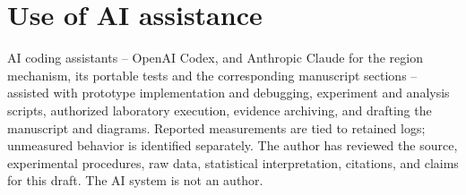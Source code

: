 \section*{Use of AI assistance}
AI coding assistants -- OpenAI Codex, and Anthropic Claude for the region
mechanism, its portable tests and the corresponding manuscript sections --
assisted with prototype implementation and debugging, experiment and analysis
scripts, authorized laboratory execution, evidence archiving, and drafting the
manuscript and diagrams. Reported measurements are tied to retained
logs; unmeasured behavior is identified separately. The author has reviewed the
source, experimental procedures, raw data, statistical interpretation, citations,
and claims for this draft. The AI system is not an author.
